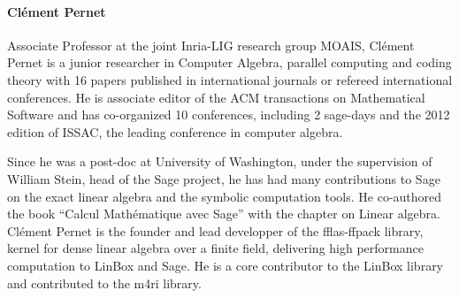 \paragraph{Cl\'ement Pernet}


Associate Professor at the joint Inria-LIG research group MOAIS, Cl\'ement
Pernet is a junior researcher in Computer Algebra, parallel computing and coding
theory with  16 papers published in international journals or refereed
international conferences. He is associate editor of the
ACM transactions on Mathematical Software and has co-organized 10 conferences,
including 2 sage-days and  the 2012 edition of ISSAC, the leading conference in
computer algebra.

Since he was a post-doc at University of Washington, under the supervision of
William Stein, head of the Sage project, he has had many contributions to Sage on
the exact linear algebra and the symbolic computation tools. He co-authored the
book ``Calcul Mathématique avec Sage'' with the chapter on Linear algebra.
Cl\'ement Pernet is the founder and lead developper of the fflas-ffpack library,
kernel for dense linear algebra over a finite field, delivering high performance
computation to LinBox and Sage. He is a core contributor to the LinBox library
and contributed to the m4ri library. 




